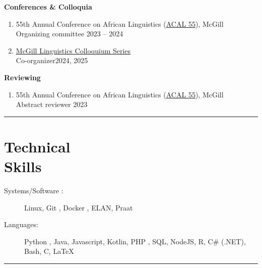 \documentclass[margin,line]{resume}
\begin{document}
\begin{resume}
	\textbf{Conferences \& Colloquia}
	\begin{enumerate}[-, leftmargin=1em, topsep=2pt]
		\item[] 55th Annual Conference on African Linguistics (\href{https://acal55.mull-lab.org/}{ACAL 55}), McGill\\
		      \hphantom{...}Organizing committee \hfill 2023 -- 2024

		\item[] \href{https://www.mcgill.ca/linguistics/events/colloquium-series}{McGill Linguistics Colloquium Series}\\
		      \hphantom{...}Co-organizer\hfill 2024, 2025
	\end{enumerate}

	\textbf{Reviewing}
	\begin{enumerate}[-, leftmargin=1em, topsep=2pt]
		\item[]  55th Annual Conference on African Linguistics (\href{https://acal55.mull-lab.org/}{ACAL 55}), McGill\\
		      \hphantom{...}Abstract reviewer \hfill 2023
	\end{enumerate}

	\vspace{-0.9em}\rule{\textwidth}{0.4pt}


	\vspace{-1em}

	\section{\mysidestyle Technical\\Skills}\vspace{2mm}
	\begin{description}
		\item[Systems/Software%
		:] Linux, Git%
		      , Docker%
		      , ELAN, Praat%
		\item[Languages:] Python%
		      , Java, Javascript, Kotlin, PHP%
		      , SQL, NodeJS, R, C\# (.NET),
		      Bash, 
			  C, \LaTeX
	\end{description}

	\vspace{-2em}\rule{\textwidth}{0.4pt}


\end{resume}
\end{document}
